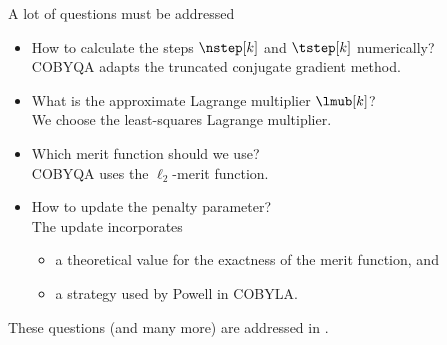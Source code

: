 \documentclass[optimization]{common/talk}
\begin{document}
\begin{frame}{A lot of questions must be addressed}
    \begin{itemize}
        \item How to calculate the steps $\nstep[k]$ and $\tstep[k]$ numerically?\\
        \textcolor{FernGreen}{COBYQA adapts the truncated conjugate gradient method.}
        \item What is the approximate Lagrange multiplier $\lmub[k]$?\\
        \textcolor{FernGreen}{We choose the least-squares Lagrange multiplier.}
        \item Which merit function should we use?\\
        \textcolor{FernGreen}{COBYQA uses the $\ell_2$-merit function.}
        \item How to update the penalty parameter?\\
        \textcolor{FernGreen}{The update incorporates}
        \begin{itemize}
            \item \textcolor{FernGreen}{a theoretical value for the exactness of the merit function, and}
            \item \textcolor{FernGreen}{a strategy used by Powell in COBYLA.}
        \end{itemize}
    \end{itemize}

    \medskip

    These questions (and many more) are addressed in \textcite{Ragonneau_2022}.
\end{frame}
\end{document}
